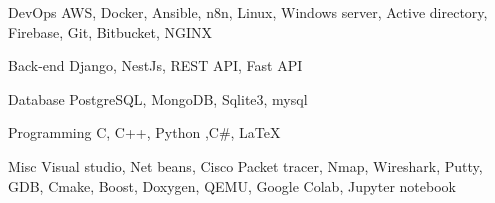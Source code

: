 

\begin{cvskills}

  
  \cvskill
    {DevOps} %
    {AWS, Docker, Ansible, n8n, Linux, Windows server, Active directory, Firebase, Git, Bitbucket, NGINX} %

  
  \cvskill
    {Back-end} %
    {Django, NestJs, REST API, Fast API} %


  \cvskill
    {Database} %
    {PostgreSQL, MongoDB, Sqlite3, mysql} %


  \cvskill
    {Programming} %
    {C, C++, Python ,C\#, LaTeX} %


  \cvskill
    {Misc} %
    {Visual studio, Net beans, Cisco Packet tracer, Nmap, Wireshark, Putty, GDB, Cmake, Boost, Doxygen, QEMU, Google Colab, Jupyter notebook} %


\end{cvskills}
